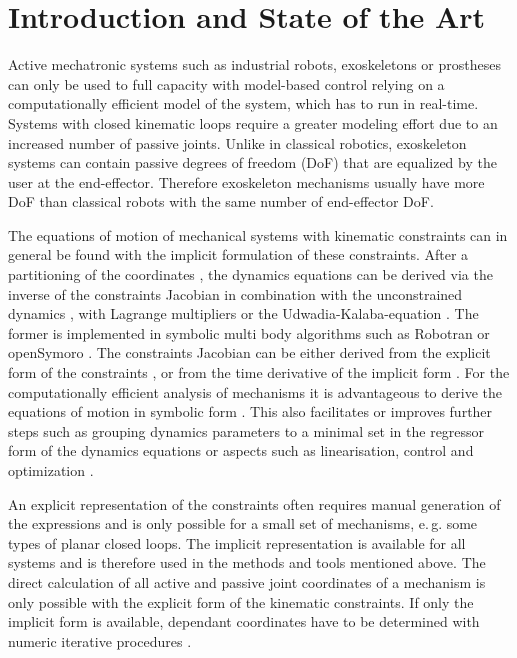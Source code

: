 \documentclass{svproc}
\begin{document}
\section{Introduction and State of the Art}

Active mechatronic systems such as industrial robots, exoskeletons or prostheses can only be used to full capacity with model-based control relying on a computationally efficient model of the system, which has to run in real-time.
Systems with closed kinematic loops require a greater modeling effort due to an increased number of passive joints.
Unlike in classical robotics, exoskeleton systems can contain passive degrees of freedom (DoF) that are equalized by the user at the end-effector.
Therefore exoskeleton mechanisms usually have more DoF than classical robots with the same number of end-effector DoF.

The equations of motion of mechanical systems with kinematic constraints can in general be found with the implicit formulation of these constraints.
After a partitioning of the coordinates \cite{WehageHau1982}, the dynamics equations can be derived via the inverse of the constraints Jacobian in combination with the unconstrained dynamics \cite{NakamuraGho1989}, with Lagrange multipliers \cite{WehageHau1982,LuhZhe1985} or the Udwadia-Kalaba-equation \cite{UdwadiaKal1992}.
The former is implemented in symbolic multi body algorithms such as Robotran \cite{SaminFis2013} or openSymoro \cite{KhalilVijKhoMuk2014}.
The constraints Jacobian can be either derived from the explicit form of the constraints \cite{NakamuraGho1989}, or from the time derivative of the implicit form \cite{ParkChoPlo1999}.
%
For the computationally efficient analysis of mechanisms it is advantageous to derive the equations of motion in symbolic form \cite{SaminFis2013}.
This also facilitates or improves further steps such as grouping dynamics parameters to a minimal set  in the regressor form of the dynamics equations \cite{KhalilBen1995} or aspects such as linearisation, control and optimization \cite{ParkChoPlo1999}.

An explicit representation of the constraints often requires manual generation of the expressions and is only possible for a small set of mechanisms, e.\,g. some types of planar closed loops.
The implicit representation is available for all systems and is therefore used in the methods and tools mentioned above.
%
The direct calculation of all active and passive joint coordinates of a mechanism is only possible with the explicit form of the kinematic constraints.
If only the implicit form is available, dependant coordinates have to be determined with numeric iterative procedures \cite{ParkChoPlo1999}.
\end{document}
